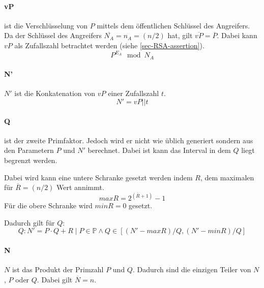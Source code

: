             \paragraph{vP} ist die Verschlüsselung von $P$ mittels dem öffentlichen Schlüssel des Angreifers. Da der Schlüssel des Angreifers $\overline{N_{A}} = n_{A} = (n/2)$ hat, gilt $\overline{vP} = \overline{P}$. Dabei kann $vP$ als Zufallszahl betrachtet werden (siehe \ref{sec-RSA-assertion}). 
                \begin{equation}
                    P^{E_{A}} \mod N_{A}
                \end{equation}                
            
            \paragraph{N'} $N'$ ist die Konkatenation von $vP$ einer Zufallszahl $t$.
            \begin{equation}
                N' = vP || t
            \end{equation}

            \paragraph{Q} ist der zweite Primfaktor. Jedoch wird er nicht wie üblich generiert sondern aus den Parametern $P$ und $N'$ berechnet. Dabei ist kann das Interval in dem $Q$ liegt begrenzt werden. 
            
            Dabei wird kann eine untere Schranke gesetzt werden indem $R$, dem maximalen für $\overline{R} = (n/2)$ Wert annimmt.
            \begin{equation}
                maxR = 2^{(\overline{R}+1)} -1
            \end{equation} 
            Für die obere Schranke wird $minR = 0$ gesetzt.
            
            Dadurch gilt für $Q$:
            \begin{equation}
                Q : N' = P \cdot Q + R \mid P \in \mathbb{P} \wedge Q \in [(N'-maxR)/Q, (N'-minR)/Q]
            \end{equation}

            \paragraph{N} $N$ ist das Produkt der Primzahl $P$ und $Q$. Dadurch sind die einzigen Teiler von $N$, $P$ oder $Q$. Dabei gilt $\overline{N} = n$.

